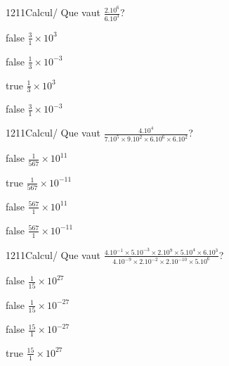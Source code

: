 \documentclass[11pt]{article}
\begin{document}
            \begin{question}{1211}{Calcul}{}{/}
                Que vaut $\frac{2.10^{6}}{6.10^{3}}$?
            \end{question}
            
            \begin{reponses}
                \item[false] $\frac{3}{1}\times 10^{3}$
                \item[false] $\frac{1}{3}\times 10^{-3}$
                \item[true] $\frac{1}{3}\times 10^{3}$
                \item[false] $\frac{3}{1}\times 10^{-3}$
            \end{reponses}
            
            \begin{question}{1211}{Calcul}{}{/}
                Que vaut $\frac{4.10^{4}}{7.10^{5}\times 9.10^{2}\times 6.10^{6}\times 6.10^{2}}$?
            \end{question}
            
            \begin{reponses}
                \item[false] $\frac{1}{567}\times 10^{11}$
                \item[true] $\frac{1}{567}\times 10^{-11}$
                \item[false] $\frac{567}{1}\times 10^{11}$
                \item[false] $\frac{567}{1}\times 10^{-11}$
            \end{reponses}
            
            \begin{question}{1211}{Calcul}{}{/}
                Que vaut $\frac{4.10^{-1}\times 5.10^{-3}\times 2.10^{9}\times 5.10^{4}\times 6.10^{3}}{4.10^{-9}\times 2.10^{-2}\times 2.10^{-10}\times 5.10^{6}}$?
            \end{question}
            
            \begin{reponses}
                \item[false] $\frac{1}{15}\times 10^{27}$
                \item[false] $\frac{1}{15}\times 10^{-27}$
                \item[false] $\frac{15}{1}\times 10^{-27}$
                \item[true] $\frac{15}{1}\times 10^{27}$
            \end{reponses}
            
\end{document}
